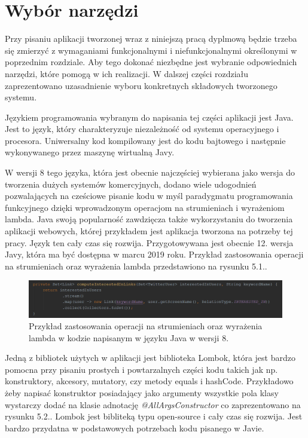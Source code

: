 \chapter{Wybór narzędzi}
\qquad Przy pisaniu aplikacji tworzonej wraz z niniejszą pracą dyplmową będzie trzeba się zmierzyć z wymaganiami funkcjonalnymi i niefunkcjonalnymi określonymi w poprzednim rozdziale. Aby tego dokonać niezbędne jest wybranie odpowiednich narzędzi, które pomogą w ich realizacji. W dalszej części rozdziału zaprezentowano uzasadnienie wyboru konkretnych składowych tworzonego systemu.

Językiem programowania wybranym do napisania tej części aplikacji jest Java. Jest to język, który charakteryzuje niezależność od systemu operacyjnego i procesora. Uniwersalny kod kompilowany jest do kodu bajtowego i następnie wykonywanego przez maszynę wirtualną Javy. 

W wersji 8 tego języka, która jest obecnie najczęściej wybierana jako wersja do tworzenia dużych systemów komercyjnych, dodano wiele udogodnień pozwalających na cześciowe pisanie kodu w myśl paradygmatu programowania funkcyjnego dzięki wprowadzonym operacjom na strumieniach i wyrażeniom lambda. Java swoją popularność zawdzięcza także wykorzystaniu do tworzenia aplikacji webowych, której przykładem jest aplikacja tworzona na potrzeby tej pracy. Język ten cały czas się rozwija. Przygotowywana jest obecnie 12. wersja Javy, która ma być dostępna w marcu 2019 roku. Przykład zastosowania operacji na strumieniach oraz wyrażenia lambda przedstawiono na rysunku 5.1..

\begin{figure}[h] %
	\centering
	\includegraphics[width=1.0\linewidth]{img/tools_java_1}
	\caption{Przykład zastosowania operacji na strumieniach oraz wyrażenia lambda w kodzie napisanym w języku Java w wersji 8.}
\end{figure}

Jedną z bibliotek użytych w aplikacji jest biblioteka Lombok, która jest bardzo pomocna przy pisaniu prostych i powtarzalnych części kodu takich jak np. konstruktory, akcesory, mutatory, czy metody equals i hashCode. Przykładowo żeby napisać konstruktor posiadający jako argumenty wszystkie pola klasy wystarczy dodać na klasie adnotację \textit{@AllArgsConstructor} co zaprezentowano na rysunku 5.2.. Lombok jest bibliteką typu open-source i cały czas się rozwija. Jest bardzo przydatna w podstawowych potrzebach kodu pisanego w Javie.  

